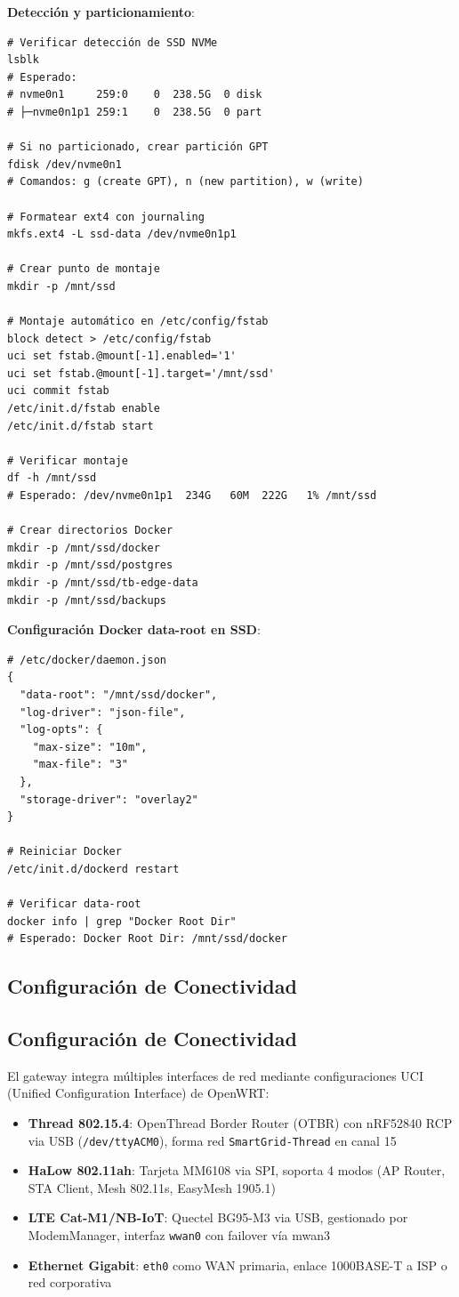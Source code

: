 \textbf{Detección y particionamiento}:
\begin{verbatim}
# Verificar detección de SSD NVMe
lsblk
# Esperado:
# nvme0n1     259:0    0  238.5G  0 disk
# ├─nvme0n1p1 259:1    0  238.5G  0 part

# Si no particionado, crear partición GPT
fdisk /dev/nvme0n1
# Comandos: g (create GPT), n (new partition), w (write)

# Formatear ext4 con journaling
mkfs.ext4 -L ssd-data /dev/nvme0n1p1

# Crear punto de montaje
mkdir -p /mnt/ssd

# Montaje automático en /etc/config/fstab
block detect > /etc/config/fstab
uci set fstab.@mount[-1].enabled='1'
uci set fstab.@mount[-1].target='/mnt/ssd'
uci commit fstab
/etc/init.d/fstab enable
/etc/init.d/fstab start

# Verificar montaje
df -h /mnt/ssd
# Esperado: /dev/nvme0n1p1  234G   60M  222G   1% /mnt/ssd

# Crear directorios Docker
mkdir -p /mnt/ssd/docker
mkdir -p /mnt/ssd/postgres
mkdir -p /mnt/ssd/tb-edge-data
mkdir -p /mnt/ssd/backups
\end{verbatim}

\textbf{Configuración Docker data-root en SSD}:
\begin{verbatim}
# /etc/docker/daemon.json
{
  "data-root": "/mnt/ssd/docker",
  "log-driver": "json-file",
  "log-opts": {
    "max-size": "10m",
    "max-file": "3"
  },
  "storage-driver": "overlay2"
}

# Reiniciar Docker
/etc/init.d/dockerd restart

# Verificar data-root
docker info | grep "Docker Root Dir"
# Esperado: Docker Root Dir: /mnt/ssd/docker
\end{verbatim}

\subsection{Configuración de Conectividad}

\subsection{Configuración de Conectividad}

El gateway integra múltiples interfaces de red mediante configuraciones UCI (Unified Configuration Interface) de OpenWRT:

\begin{itemize}
    \item \textbf{Thread 802.15.4}: OpenThread Border Router (OTBR) con nRF52840 RCP via USB (\texttt{/dev/ttyACM0}), forma red \texttt{SmartGrid-Thread} en canal 15
    \item \textbf{HaLow 802.11ah}: Tarjeta MM6108 via SPI, soporta 4 modos (AP Router, STA Client, Mesh 802.11s, EasyMesh 1905.1)
    \item \textbf{LTE Cat-M1/NB-IoT}: Quectel BG95-M3 via USB, gestionado por ModemManager, interfaz \texttt{wwan0} con failover vía mwan3
    \item \textbf{Ethernet Gigabit}: \texttt{eth0} como WAN primaria, enlace 1000BASE-T a ISP o red corporativa
\end{itemize}

